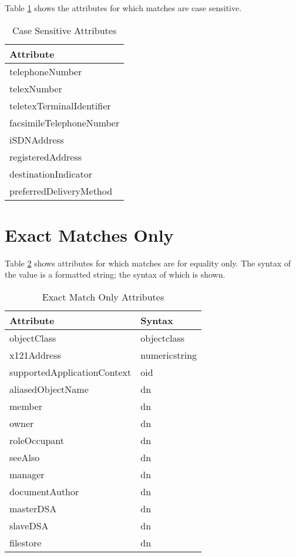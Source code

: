 Table \ref{case_sense} shows the attributes for which matches are case sensitive.

\begin{table}
\centering
\begin{tabular}{|l|} \hline
Attribute \\ \hline
telephoneNumber \\
telexNumber  \\
teletexTerminalIdentifier \\
facsimileTelephoneNumber \\
iSDNAddress \\
registeredAddress  \\
destinationIndicator  \\
preferredDeliveryMethod  \\ \hline
\end{tabular}
\caption{Case Sensitive Attributes}
\label{case_sense}
\end{table}

\section {Exact Matches Only}

Table \ref{exact_match} shows attributes for which matches are for
equality only.
The syntax of the value is a formatted string; the syntax of which is
shown.

\begin{table}
\centering
\begin{tabular}{|l|l|} \hline
Attribute & Syntax \\ \hline
objectClass & objectclass \\
x121Address & numericstring\\
supportedApplicationContext & oid\\
aliasedObjectName & dn \\
member & dn\\
owner & dn\\
roleOccupant & dn\\
seeAlso & dn\\
manager & dn\\
documentAuthor & dn\\
masterDSA & dn\\
slaveDSA & dn\\
filestore & dn\\ \hline
\end{tabular}
\caption{Exact Match Only Attributes}
\label{exact_match}
\end{table}
